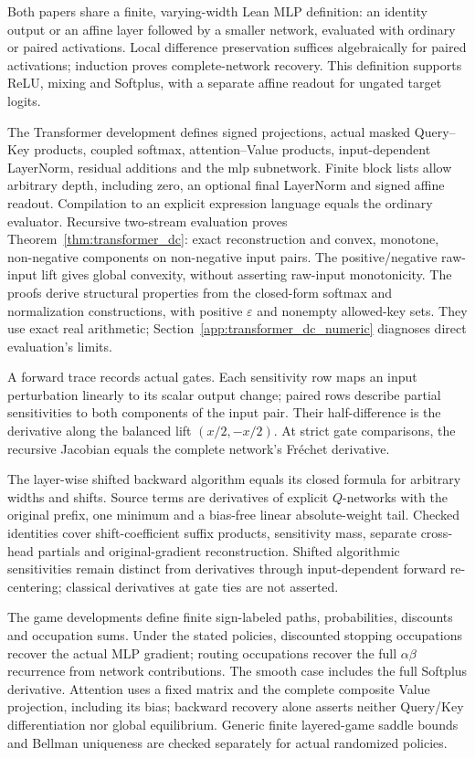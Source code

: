 Both papers share a finite, varying-width Lean MLP definition: an identity output or an affine layer followed by a smaller network, evaluated with ordinary or paired activations. Local difference preservation suffices algebraically for paired activations; induction proves complete-network recovery. This definition supports ReLU, mixing and Softplus, with a separate affine readout for ungated target logits.

The Transformer development defines signed projections, actual masked Query--Key products, coupled softmax, attention--Value products, input-dependent LayerNorm, residual additions and the \ac{mlp} subnetwork. Finite block lists allow arbitrary depth, including zero, an optional final LayerNorm and signed affine readout. Compilation to an explicit expression language equals the ordinary evaluator. Recursive two-stream evaluation proves Theorem~\ref{thm:transformer_dc}: exact reconstruction and convex, monotone, non-negative components on non-negative input pairs. The positive/negative raw-input lift gives global convexity, without asserting raw-input monotonicity. The proofs derive structural properties from the closed-form softmax and normalization constructions, with positive $\varepsilon$ and nonempty allowed-key sets. They use exact real arithmetic; Section~\ref{app:transformer_dc_numeric} diagnoses direct evaluation's limits.

A forward trace records actual gates. Each sensitivity row maps an input perturbation linearly to its scalar output change; paired rows describe partial sensitivities to both components of the input pair. Their half-difference is the derivative along the balanced lift $(x/2,-x/2)$. At strict gate comparisons, the recursive Jacobian equals the complete network's Fr\'echet derivative.

The layer-wise shifted backward algorithm equals its closed formula for arbitrary widths and shifts. Source terms are derivatives of explicit $Q$-networks with the original prefix, one minimum and a bias-free linear absolute-weight tail. Checked identities cover shift-coefficient suffix products, sensitivity mass, separate cross-head partials and original-gradient reconstruction. Shifted algorithmic sensitivities remain distinct from derivatives through input-dependent forward re-centering; classical derivatives at gate ties are not asserted.

The game developments define finite sign-labeled paths, probabilities, discounts and occupation sums. Under the stated policies, discounted stopping occupations recover the actual MLP gradient; routing occupations recover the full $\alpha\beta$ recurrence from network contributions. The smooth case includes the full Softplus derivative. Attention uses a fixed matrix and the complete composite Value projection, including its bias; backward recovery alone asserts neither Query/Key differentiation nor global equilibrium. Generic finite layered-game saddle bounds and Bellman uniqueness are checked separately for actual randomized policies.

